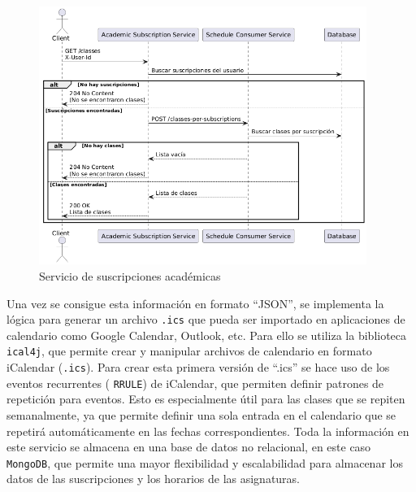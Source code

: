 \begin{figure}[H]
    \centering
    \includegraphics[width=0.95\textwidth]{figures/07_classes.png}
    \caption{Servicio de suscripciones académicas}
    \label{classes}
\end{figure}

Una vez se consigue esta información en formato ``JSON'', se implementa la lógica para generar un archivo \texttt{.ics}\cite{icalendar} que pueda ser importado en aplicaciones de calendario como Google Calendar, Outlook, etc. Para ello se utiliza la biblioteca \texttt{ical4j}, que permite crear y manipular archivos de calendario en formato iCalendar (\texttt{.ics}).\newline
\newline
Para crear esta primera versión de ``.ics'' se hace uso de los eventos recurrentes ( \texttt{RRULE}) de iCalendar, que permiten definir patrones de repetición para eventos. Esto es especialmente útil para las clases que se repiten semanalmente, ya que permite definir una sola entrada en el calendario que se repetirá automáticamente en las fechas correspondientes.\newline
\newline
Toda la información en este servicio se almacena en una base de datos no relacional, en este caso \texttt{MongoDB}, que permite una mayor flexibilidad y escalabilidad para almacenar los datos de las suscripciones y los horarios de las asignaturas. 

